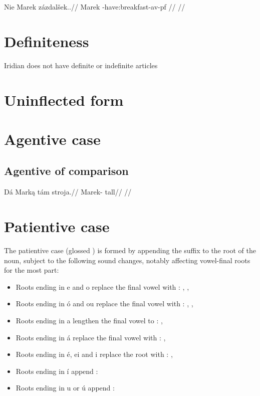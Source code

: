 \pex
\begingl
    \gla Nie Marek z\'azdal\v{s}ek..//
    \glb {} Marek -have:breakfast-{av-pf} //
    \glft {}//
\endgl
\xe


\section{Definiteness}
Iridian does not have definite or indefinite articles

\section{Uninflected form}

\section{Agentive case}

\subsection{Agentive of comparison}
\pex
\begingl
\gla D\'a Mark\k{a} t\'am stroja.//
\glb {} Marek-  tall//
\glft {}//
\endgl
\xe

\section{Patientive case}

The patientive case (glossed ) is formed by appending the suffix  to the root of the noun, subject to the following sound changes, notably affecting vowel-final roots for the most part:

\begin{itemize}
	\item Roots ending in e and o replace the final vowel with :  ,  ,  
	\item Roots ending in \'o and ou replace the final vowel with :  ,  ,  
	\item Roots ending in a lengthen the final vowel to :  ,  
	\item Roots ending in \'a replace the final vowel with :  ,  
	\item Roots ending in \'e, ei and i replace the root with :  ,  
	\item Roots ending in \'i append :
	\item Roots ending in u or \'u append :
\end{itemize}

